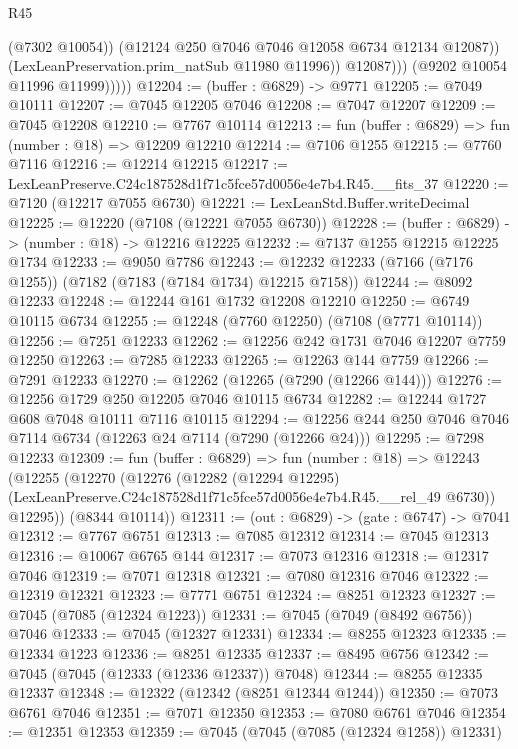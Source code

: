 \begin{lexlean}{R45}
\begin{coremodule}
{                        (@7302 @10054))
                      (@12124 @250 @7046 @7046 @12058 @6734 @12134 @12087))
                    (LexLeanPreservation.prim_natSub @11980 @11996))
                  @12087)))
            (@9202 @10054 @11996 @11999)))))
@12204 := (buffer : @6829) -> @9771
@12205 := @7049 @10111
@12207 := @7045 @12205 @7046
@12208 := @7047 @12207
@12209 := @7045 @12208
@12210 := @7767 @10114
@12213 := fun (buffer : @6829) => fun (number : @18) => @12209 @12210
@12214 := @7106 @1255
@12215 := @7760 @7116
@12216 := @12214 @12215
@12217 := LexLeanPreserve.C24c187528d1f71c5fce57d0056e4e7b4.R45.__fits_37
@12220 := @7120 (@12217 @7055 @6730)
@12221 := LexLeanStd.Buffer.writeDecimal
@12225 := @12220 (@7108 (@12221 @7055 @6730))
@12228 := (buffer : @6829) -> (number : @18) -> @12216 @12225
@12232 := @7137 @1255 @12215 @12225 @1734
@12233 := @9050 @7786
@12243 := @12232 @12233 (@7166 (@7176 @1255)) (@7182 (@7183 (@7184 @1734) @12215 @7158))
@12244 := @8092 @12233
@12248 := @12244 @161 @1732 @12208 @12210
@12250 := @6749 @10115 @6734
@12255 := @12248 (@7760 @12250) (@7108 (@7771 @10114))
@12256 := @7251 @12233
@12262 := @12256 @242 @1731 @7046 @12207 @7759 @12250
@12263 := @7285 @12233
@12265 := @12263 @144 @7759
@12266 := @7291 @12233
@12270 := @12262 (@12265 (@7290 (@12266 @144)))
@12276 := @12256 @1729 @250 @12205 @7046 @10115 @6734
@12282 := @12244 @1727 @608 @7048 @10111 @7116 @10115
@12294 := @12256 @244 @250 @7046 @7046 @7114 @6734 (@12263 @24 @7114 (@7290 (@12266 @24)))
@12295 := @7298 @12233
@12309 := fun (buffer : @6829) =>
  fun (number : @18) =>
  @12243
    (@12255
      (@12270
        (@12276
          (@12282
            (@12294 @12295)
            (LexLeanPreserve.C24c187528d1f71c5fce57d0056e4e7b4.R45.__rel_49 @6730))
          @12295))
      (@8344 @10114))
@12311 := (out : @6829) -> (gate : @6747) -> @7041
@12312 := @7767 @6751
@12313 := @7085 @12312
@12314 := @7045 @12313
@12316 := @10067 @6765 @144
@12317 := @7073 @12316
@12318 := @12317 @7046
@12319 := @7071 @12318
@12321 := @7080 @12316 @7046
@12322 := @12319 @12321
@12323 := @7771 @6751
@12324 := @8251 @12323
@12327 := @7045 (@7085 (@12324 @1223))
@12331 := @7045 (@7049 (@8492 @6756)) @7046
@12333 := @7045 (@12327 @12331)
@12334 := @8255 @12323
@12335 := @12334 @1223
@12336 := @8251 @12335
@12337 := @8495 @6756
@12342 := @7045 (@7045 (@12333 (@12336 @12337)) @7048)
@12344 := @8255 @12335 @12337
@12348 := @12322 (@12342 (@8251 @12344 @1244))
@12350 := @7073 @6761 @7046
@12351 := @7071 @12350
@12353 := @7080 @6761 @7046
@12354 := @12351 @12353
@12359 := @7045 (@7045 (@7085 (@12324 @1258)) @12331)
}
\end{coremodule}
\end{lexlean}

